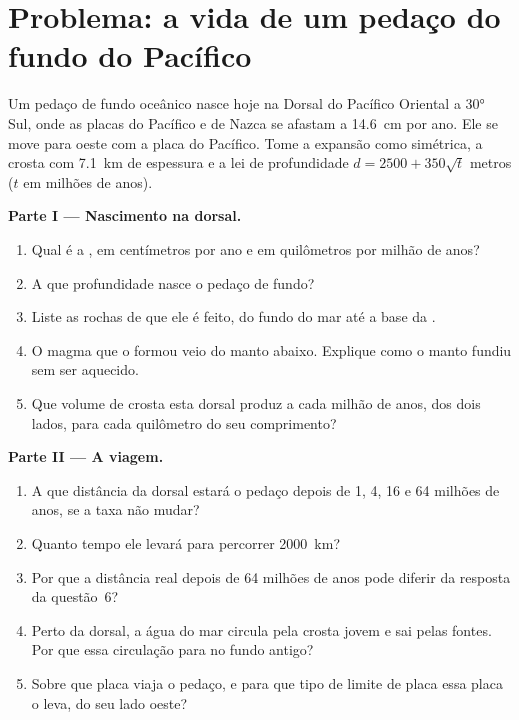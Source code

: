 \section{Problema: a vida de um pedaço do fundo do Pacífico}

\begin{problem}
\label{pb:g11:ocean-ridges:1}
Um pedaço de fundo oceânico nasce hoje na Dorsal do Pacífico Oriental a
\ang{30} Sul, onde as placas do Pacífico e de Nazca se afastam a
\qty{14.6}{cm} por ano. Ele se move para oeste com a placa do Pacífico.
Tome a expansão como simétrica, a crosta com \qty{7.1}{km} de espessura e a
lei de profundidade $d = 2500 + 350\sqrt{t}$ metros ($t$ em milhões de
anos).

\medskip
\noindent\textbf{Parte I --- Nascimento na dorsal.}
\begin{enumerate}
  \item Qual é a , em centímetros por ano e em
        quilômetros por milhão de anos?
  \item A que profundidade nasce o pedaço de fundo?
  \item Liste as rochas de que ele é feito, do fundo do mar até a base da
        .
  \item O magma que o formou veio do manto abaixo. Explique como o manto
        fundiu sem ser aquecido.
  \item Que volume de crosta esta dorsal produz a cada milhão de anos, dos
        dois lados, para cada quilômetro do seu comprimento?
\end{enumerate}

\medskip
\noindent\textbf{Parte II --- A viagem.}
\begin{enumerate}[resume]
  \item A que distância da dorsal estará o pedaço depois de 1, 4, 16 e 64
        milhões de anos, se a taxa não mudar?
  \item Quanto tempo ele levará para percorrer \qty{2000}{km}?
  \item Por que a distância real depois de 64 milhões de anos pode diferir
        da resposta da questão~6?
  \item Perto da dorsal, a água do mar circula pela crosta jovem e sai pelas
        fontes. Por que essa circulação para no fundo antigo?
  \item Sobre que placa viaja o pedaço, e para que tipo de limite de placa
        essa placa o leva, do seu lado oeste?
\end{enumerate}


\end{problem}
